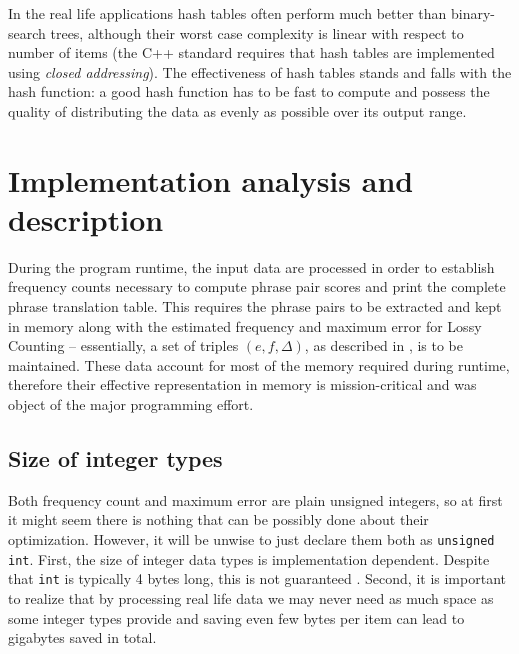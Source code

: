 In the real life applications hash tables often perform much better than binary-search
trees, although their worst case complexity is linear with respect to number of items
(the C++ standard requires that hash tables are implemented using
\emph{closed addressing}).
The effectiveness of hash tables stands and falls with the hash function:
a good hash function has to be fast to compute and possess the quality of distributing
the data as evenly as possible over its output range.

\section{Implementation analysis and description}

During the program runtime, the input data are processed in order to establish frequency counts
necessary to compute phrase pair scores and print the complete phrase translation table.
This requires the phrase pairs to be extracted and kept in memory along with the estimated
frequency and maximum error for Lossy Counting -- essentially, a set of triples $(e, f, \Delta)$,
as described in , is to be maintained.
These data account for most of the memory required during runtime, therefore their effective
representation in memory is mission-critical and was object of the major programming effort.

\subsection{Size of integer types}

Both frequency count and maximum error are plain unsigned integers, so at first it might seem
there is nothing that can be possibly done about their optimization.
However, it will be unwise to just declare them both as \texttt{unsigned int}.
First, the size of integer data types is implementation dependent.
Despite that \texttt{int} is typically 4 bytes long, this is not guaranteed \citep[Chapter 4.6]{stroustrup:cplusplus}.
Second, it is important to realize that by processing real life data we may never need as much
space as some integer types provide and saving even few bytes per item can lead to gigabytes
saved in total.

